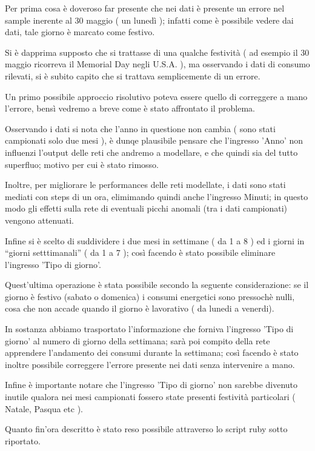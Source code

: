 Per prima cosa è doveroso far presente che nei dati è presente un errore nel sample inerente al 30 maggio ( un lunedì ); infatti come è possibile vedere dai dati, tale giorno è marcato come festivo.

Si è dapprima supposto che si trattasse di una qualche festività ( ad esempio il 30 maggio ricorreva il Memorial Day negli U.S.A. ), ma osservando i dati di consumo rilevati, si è subito capito che si trattava semplicemente di un errore.

Un primo possibile approccio risolutivo poteva essere quello di correggere a mano l'errore, bensì vedremo a breve come è stato affrontato il problema.

Osservando i dati si nota che l'anno in questione non cambia ( sono stati campionati solo due mesi ), è dunqe plausibile pensare che l'ingresso 'Anno' non influenzi l'output delle reti che andremo a modellare, e che quindi sia del tutto superfluo; motivo per cui è stato rimosso.

Inoltre, per migliorare le performances delle reti modellate, i dati sono stati mediati con steps di un ora, elimimando quindi anche l'ingresso Minuti; in questo modo gli effetti sulla rete di eventuali picchi anomali (tra i dati campionati) vengono attenuati.

Infine si è scelto di suddividere i due mesi in settimane ( da 1 a 8 ) ed i giorni in “giorni setttimanali” ( da 1 a 7 ); così facendo è stato possibile eliminare l'ingresso 'Tipo di giorno'.

Quest'ultima operazione è stata possibile secondo la seguente considerazione: se il giorno è festivo (sabato o domenica) i consumi energetici sono pressochè nulli, cosa che non accade quando il giorno è lavorativo ( da lunedi a venerdi). 

In sostanza abbiamo trasportato l'informazione che forniva l'ingresso 'Tipo di giorno' al numero di giorno della settimana; sarà poi compito della rete apprendere l'andamento dei consumi durante la settimana; così facendo è stato inoltre possibile correggere l'errore presente nei dati senza intervenire a mano.

Infine è importante notare che l'ingresso 'Tipo di giorno' non sarebbe divenuto inutile qualora nei mesi campionati fossero state presenti festività particolari ( Natale, Pasqua etc ).

Quanto fin'ora descritto è stato reso possibile attraverso lo script ruby sotto riportato.

\inputminted[linenos=true,fontsize=\footnotesize]{ruby}{../../data/conform.rb}


\clearpage
